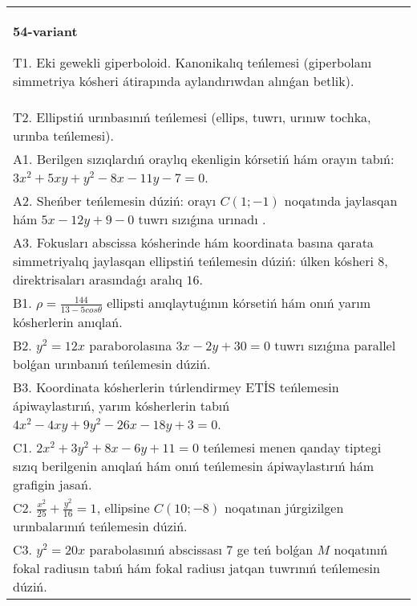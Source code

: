 \documentclass{article}
\begin{document}
\begin{tabular}{m{17cm}}
\textbf{54-variant}
\newline

T1. Eki gewekli giperboloid. Kanonikalıq teńlemesi (giperbolanı simmetriya kósheri átirapında aylandırıwdan alınǵan betlik).\\

T2. Ellipstiń urınbasınıń teńlemesi (ellips, tuwrı, urınıw tochka, urınba teńlemesi).\\

A1. Berilgen sızıqlardıń oraylıq ekenligin kórsetiń hám orayın tabıń: $3 x^{2}+5 xy+y^{2}-8 x-11 y-7=0$.\\

A2. Sheńber teńlemesin dúziń: orayı $C (1;-1) $ noqatında jaylasqan hám $5 x-12 y+9 -0$ tuwrı sızıǵına urınadı .\\

A3. Fokusları abscissa kósherinde hám koordinata basına qarata simmetriyalıq jaylasqan ellipstiń teńlemesin dúziń: úlken kósheri $8$, direktrisaları arasındaǵı aralıq $16$.\\

B1. $\rho = \frac{144}{13 - 5cos\theta}$ ellipsti anıqlaytuǵının kórsetiń hám onıń yarım kósherlerin anıqlań.\\

B2. $y^{2} = 12x$ paraborolasına $3x - 2y + 30 = 0$ tuwrı sızıǵına parallel bolǵan urınbanıń teńlemesin dúziń.  \\

B3. Koordinata kósherlerin túrlendirmey ETİS teńlemesin ápiwaylastırıń, yarım kósherlerin tabıń $4x^{2} - 4xy + 9y^{2} - 26x - 18y + 3 = 0$.\\

C1. $2x^{2} + 3y^{2} + 8x - 6y + 11 = 0$ teńlemesi menen qanday tiptegi sızıq berilgenin anıqlań hám onıń teńlemesin ápiwaylastırıń hám grafigin jasań.  \\

C2. $\frac{x^{2}}{25} + \frac{y^{2}}{16} = 1$, ellipsine $C(10; - 8)$ noqatınan júrgizilgen urınbalarınıń teńlemesin dúziń.  \\

C3. $y^{2} = 20x$ parabolasınıń abscissası 7 ge teń bolǵan $M$ noqatınıń fokal radiusın tabıń hám fokal radiusı jatqan tuwrınıń teńlemesin dúziń.  \\

\end{tabular}
\vspace{1cm}
\end{document}
